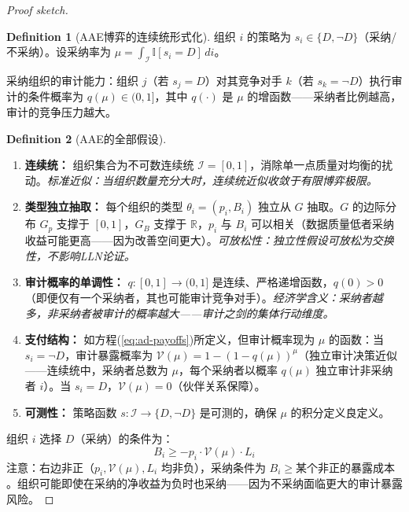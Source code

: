 \documentclass[12pt,a4paper]{ctexart}
\theoremstyle{definition}
\newtheorem{definition}{Definition}[section]
\theoremstyle{remark}
\begin{document}
\begin{proof}[Proof sketch]
\begin{definition}[AAE博弈的连续统形式化]
组织 $i$ 的策略为 $s_i \in \{D, \neg D\}$（采纳/不采纳）。设采纳率为 $\mu = \int_{\mathcal{I}} \mathbb{I}[s_i = D] \, di$。

采纳组织的审计能力：组织 $j$（若 $s_j = D$）对其竞争对手 $k$（若 $s_k = \neg D$）执行审计的条件概率为 $q(\mu) \in (0, 1]$，其中 $q(\cdot)$ 是 $\mu$ 的增函数——采纳者比例越高，审计的竞争压力越大。
\end{definition}

\begin{definition}[AAE的全部假设]
\label{def:aae-assumptions}
\begin{enumerate}[label=\textbf{E\arabic*}, leftmargin=*, itemsep=4pt]
\item \textbf{连续统：} 组织集合为不可数连续统 $\mathcal{I} = [0,1]$，消除单一点质量对均衡的扰动。\hfill\textit{标准近似：当组织数量充分大时，连续统近似收敛于有限博弈极限。}

\item \textbf{类型独立抽取：} 每个组织的类型 $\theta_i = (p_i, B_i)$ 独立从 $G$ 抽取。$G$ 的边际分布 $G_p$ 支撑于 $[0,1]$，$G_B$ 支撑于 $\mathbb{R}$，$p_i$ 与 $B_i$ 可以相关（数据质量低者采纳收益可能更高——因为改善空间更大）。\hfill\textit{可放松性：独立性假设可放松为交换性，不影响LLN论证。}

\item \textbf{审计概率的单调性：} $q: [0,1] \to (0, 1]$ 是连续、严格递增函数，$q(0) > 0$（即便仅有一个采纳者，其也可能审计竞争对手）。\hfill\textit{经济学含义：采纳者越多，非采纳者被审计的概率越大——审计之剑的集体行动维度。}

\item \textbf{支付结构：} 如方程(\ref{eq:ad-payoffs})所定义，但审计概率现为 $\mu$ 的函数：当 $s_i = \neg D$，审计暴露概率为 $\mathcal{V}(\mu) = 1 - (1 - q(\mu))^{\mu}$（独立审计决策近似——连续统中，采纳者总数为 $\mu$，每个采纳者以概率 $q(\mu)$ 独立审计非采纳者 $i$）。当 $s_i = D$，$\mathcal{V}(\mu) = 0$（伙伴关系保障）。

\item \textbf{可测性：} 策略函数 $s: \mathcal{I} \to \{D, \neg D\}$ 是可测的，确保 $\mu$ 的积分定义良定义。
\end{enumerate}
\end{definition}

组织 $i$ 选择 $D$（采纳）的条件为：
\begin{equation}
B_i \geq -p_i \cdot \mathcal{V}(\mu) \cdot L_i
\label{eq:adopt-condition}
\end{equation}
注意：右边非正（$p_i, \mathcal{V}(\mu), L_i$ 均非负），采纳条件为 $B_i \geq \text{某个非正的暴露成本}$。组织可能即使在采纳的净收益为负时也采纳——因为不采纳面临更大的审计暴露风险。


\end{proof}
\end{document}
